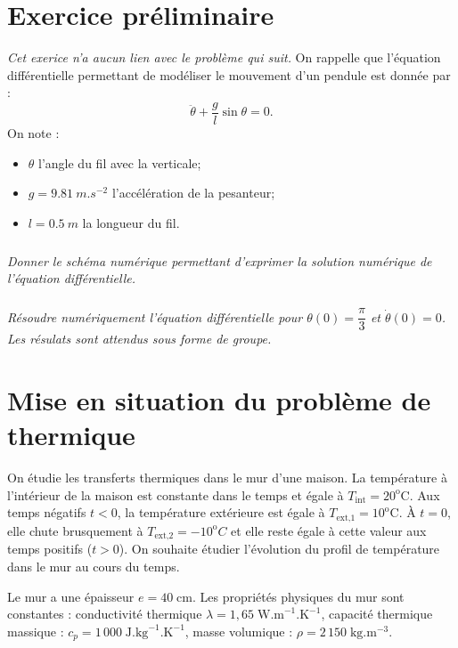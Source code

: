 \documentclass[10pt,fleqn]{article} %
\begin{document}
\def\columnseprulecolor{\color{ocre}}
\setlength{\columnseprule}{0.4pt} 


\vspace{5cm}
\pagestyle{fancy}
\thispagestyle{plain}

\ifprof
\else
\begin{multicols}{2}
\fi


\section*{Exercice préliminaire}
\textit{Cet exerice n'a aucun lien avec le problème qui suit.}
On rappelle que l'équation différentielle permettant de modéliser le mouvement d'un pendule est donnée par : 
$$
\ddot{\theta} + \dfrac{g}{l} \sin \theta = 0.
$$
On note : 
\begin{itemize}
\item $\theta$ l'angle du fil avec la verticale;
\item $g=\SI{9.81}{m.s^{-2}}$ l'accélération de la pesanteur;
\item $l=\SI{0,5}{m}$ la longueur du fil. 
\end{itemize}

\subparagraph{}\textit{Donner le schéma numérique permettant d'exprimer la solution numérique de l'équation différentielle.}

\subparagraph{}\textit{Résoudre numériquement l'équation différentielle pour $\theta(0)=\dfrac{\pi}{3}$ et $\dot{\theta}(0)=0$. Les résulats sont attendus sous forme de groupe. }


\section*{Mise en situation du problème de thermique}
\setcounter{exo}{0}
\ifprof
\else
\vspace{.25cm}


On étudie les transferts thermiques dans le mur d’une maison. La température à
l'intérieur de la maison est constante dans le temps et égale à $T_{\text{int}}=20^{\text{o}} \text{C}$. Aux temps négatifs $t<0$, la température extérieure est égale à $T_{\text{ext,1}}=10^{\text{o}} \text{C}$. À $t=0$, elle chute brusquement à $T_{\text{ext,2}}=-10^{\text{o}} C$ et elle reste égale à cette valeur aux temps positifs ($t>0$). On
souhaite étudier l'évolution du profil de température dans le mur au cours du temps.

Le mur a une épaisseur $e=40\;\text{cm}$. Les propriétés physiques du mur sont constantes : conductivité thermique $\lambda = 1,65\; \text{W.m}^{-1}.\text{K}^{-1}$, capacité thermique massique : $c_p = 1\, 000\; \text{J}.\text{kg}^{-1}.\text{K}^{-1}$, masse volumique : $\rho = 2\, 150 \; \text{kg}.\text{m}^{-3}$. 



\end{multicols}
\end{document}
